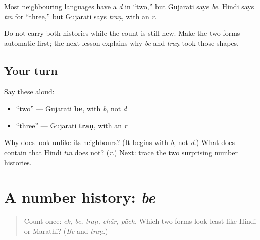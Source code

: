 \begin{grammarlens}[title={What you've built: two surprises}]
Most neighbouring languages have a \emph{d} in “two,” but Gujarati says \textbf{} \emph{be}. Hindi says \emph{tīn} for “three,” but Gujarati says \textbf{} \emph{traṇ}, with an \emph{r}.

Do not carry both histories while the count is still new. Make the two forms automatic first; the next lesson explains why \emph{be} and \emph{traṇ} took those shapes.
\end{grammarlens}

\subsection*{Your turn}
Say these aloud:

\begin{itemize}
\raggedright
  \item \textquotedblleft{}two\textquotedblright{} — Gujarati \textbf{be}, with \emph{b}, not \emph{d}
  \item \textquotedblleft{}three\textquotedblright{} — Gujarati \textbf{traṇ}, with an \emph{r}
\end{itemize}

\begin{tcolorbox}[breakable,colback=teal!4,colframe=teal!35!black,title={Before you move on}]
Why does \textbf{} look unlike its neighbours? (It begins with \emph{b}, not \emph{d}.) What does \textbf{} contain that Hindi \emph{tīn} does not? (\emph{r}.) Next: trace the two surprising number histories.
\end{tcolorbox}
\section[\texorpdfstring{\gu{બે} · \gu{ત્રણ} (be · traṇ)}{બે · ત્રણ (be · traṇ)}]{A number history: \emph{be}}

\label{lesson:GU-C06-number-histories}



\begin{quote}
Count once: \emph{ek, be, traṇ, chār, pā̃ch}. Which two forms look least like Hindi or Marathi? (\emph{Be} and \emph{traṇ}.)
\end{quote}

